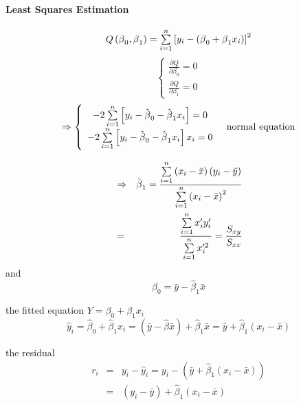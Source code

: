 \documentclass{article}
\begin{document}
\paragraph{Least Squares Estimation}

\begin{equation*}
Q\left( \beta _{0},\beta _{1}\right) =\tsum\limits_{i=1}^{n}\left[
y_{i}-\left( \beta _{0}+\beta _{1}x_{i}\right) \right] ^{2}
\end{equation*}%
\begin{equation*}
\left\{ 
\begin{array}{c}
\frac{\partial Q}{\partial \beta _{0}}=0 \\ 
\frac{\partial Q}{\partial \beta _{1}}=0%
\end{array}%
\right.
\end{equation*}%
\begin{equation*}
\Rightarrow \left\{ 
\begin{array}{c}
-2\tsum\limits_{i=1}^{n}\left[ y_{i}-\hat{\beta}_{0}-\hat{\beta}_{1}x_{i}%
\right] =0 \\ 
-2\tsum\limits_{i=1}^{n}\left[ y_{i}-\hat{\beta}_{0}-\hat{\beta}_{1}x_{i}%
\right] x_{i}=0%
\end{array}%
\right. \text{normal equation}
\end{equation*}

\begin{eqnarray*}
&\Rightarrow &\hat{\beta}_{1}=\frac{\tsum\limits_{i=1}^{n}\left( x_{i}-\bar{x%
}\right) \left( y_{i}-\bar{y}\right) }{\tsum\limits_{i=1}^{n}\left( x_{i}-%
\bar{x}\right) ^{2}} \\
&=&\frac{\tsum\limits_{i=1}^{n}x_{i}^{\prime }y_{i}^{\prime }}{%
\tsum\limits_{i=1}^{n}x_{i}^{\prime 2}}=\frac{S_{xy}}{S_{xx}}
\end{eqnarray*}%
and%
\begin{equation*}
\hat{\beta}_{0}=\bar{y}-\hat{\beta}_{1}\bar{x}
\end{equation*}

the fitted equation $Y=\beta _{0}+\beta _{1}x_{i}$%
\begin{equation*}
\hat{y}_{i}=\hat{\beta}_{0}+\hat{\beta}_{1}x_{i}=\left( \bar{y}-\hat{\beta}%
\bar{x}\right) +\hat{\beta}_{1}\bar{x}=\bar{y}+\hat{\beta}_{1}\left( x_{i}-%
\bar{x}\right)
\end{equation*}

the residual%
\begin{eqnarray*}
r_{i} &=&y_{i}-\hat{y}_{i}=y_{i}-\left( \bar{y}+\hat{\beta}_{1}\left( x_{i}-%
\bar{x}\right) \right) \\
&=&\left( y_{i}-\bar{y}\right) +\hat{\beta}_{1}\left( x_{i}-\bar{x}\right)
\end{eqnarray*}
\end{document}
